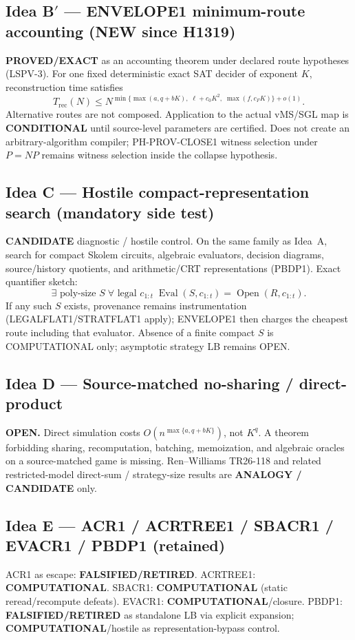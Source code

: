 \documentclass[11pt]{article}
\begin{document}
\subsection*{Idea B$'$ --- ENVELOPE1 minimum-route accounting (NEW since H1319)}
\textbf{PROVED/EXACT} as an accounting theorem under declared route hypotheses (LSPV-3).
For one fixed deterministic exact SAT decider of exponent $K$, reconstruction time satisfies
\[
T_{\mathrm{rec}}(N)\le N^{\min\{\max(a,q+bK),\;\ell+c_0K^2,\;\max(f,c_FK)\}+o(1)}.
\]
Alternative routes are not composed. Application to the actual vMS/SGL map is
\textbf{CONDITIONAL} until source-level parameters are certified. Does not create an
arbitrary-algorithm compiler; PH-PROV-CLOSE1 witness selection under $P=NP$ remains
witness selection inside the collapse hypothesis.

\subsection*{Idea C --- Hostile compact-representation search (mandatory side test)}
\textbf{CANDIDATE} diagnostic / hostile control. On the same family as Idea~A, search for
compact Skolem circuits, algebraic evaluators, decision diagrams, source/history quotients,
and arithmetic/CRT representations (PBDP1). Exact quantifier sketch:
\[
\exists\text{ poly-size }S\;\forall\text{ legal }c_{1:t}\;
\operatorname{Eval}(S,c_{1:t})=\operatorname{Open}(R,c_{1:t}).
\]
If any such $S$ exists, provenance remains instrumentation (LEGALFLAT1/STRATFLAT1 apply);
ENVELOPE1 then charges the cheapest route including that evaluator. Absence of a finite
compact $S$ is COMPUTATIONAL only; asymptotic strategy LB remains OPEN.

\subsection*{Idea D --- Source-matched no-sharing / direct-product}
\textbf{OPEN.} Direct simulation costs $O(n^{\max\{a,q+bK\}})$, not $K^q$.
A theorem forbidding sharing, recomputation, batching, memoization, and algebraic oracles
on a source-matched game is missing. Ren--Williams TR26-118 and related restricted-model
direct-sum / strategy-size results are \textbf{ANALOGY / CANDIDATE} only.

\subsection*{Idea E --- ACR1 / ACRTREE1 / SBACR1 / EVACR1 / PBDP1 (retained)}
ACR1 as escape: \textbf{FALSIFIED/RETIRED}.
ACRTREE1: \textbf{COMPUTATIONAL}.
SBACR1: \textbf{COMPUTATIONAL} (static reread/recompute defeats).
EVACR1: \textbf{COMPUTATIONAL}/closure.
PBDP1: \textbf{FALSIFIED/RETIRED} as standalone LB via explicit expansion;
\textbf{COMPUTATIONAL}/hostile as representation-bypass control.
\end{document}
